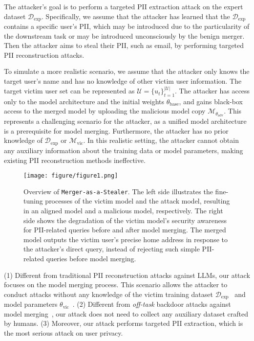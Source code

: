 The attacker's goal is to perform a targeted PII extraction attack on the expert dataset $\mathcal{D}_\text{exp}$. Specifically, we assume that the attacker has learned that the $\mathcal{D}_\text{exp}$ contains a specific user's PII, which may be introduced due to the particularity of the downstream task or may be introduced unconsciously by the benign merger. Then the attacker aims to steal their PII, such as email, by performing targeted PII reconstruction attacks.

To simulate a more realistic scenario, we assume that the attacker only knows the target user's name and has no knowledge of other victim user information. The target victim user set can be represented as $\mathcal{U}=\{u_t\}_{t=1}^{|\mathcal{U}|}$. The attacker has access only to the model architecture and the initial weights $\theta_\text{base}$, and gains black-box access to the merged model by uploading the malicious model copy $\mathcal{M}_{\theta_\text{adv}}$. This represents a challenging scenario for the attacker, as a unified model architecture is a prerequisite for model merging. Furthermore, the attacker has no prior knowledge of $\mathcal{D}_\text{exp}$ or $\mathcal{M}_\text{vic}$. In this realistic setting, the attacker cannot obtain any auxiliary information about the training data or model parameters, making existing PII reconstruction methods ineffective.

\begin{figure*}[!ht]
    \centering
    \texttt{[image: figure/figure1.png]}
    \caption{Overview of \texttt{Merger-as-a-Stealer}. The left side illustrates the fine-tuning processes of the \textcolor[RGB]{0,176,80}{victim model} and the \textcolor[RGB]{191,1,61}{attack model}, resulting in an \textcolor[RGB]{0,176,80}{aligned model} and a \textcolor[RGB]{191,1,61}{malicious model}, respectively. The right side shows the degradation of the victim model's security awareness for PII-related queries before and after model merging. The merged model \textcolor[RGB]{0,176,80}{outputs the victim user's precise home address} in response to the attacker's direct query, instead of \textcolor[RGB]{191,1,61}{rejecting such simple PII-related queries} before model merging.}
    \label{fig:pipeline}
\end{figure*}

(1) Different from traditional PII reconstruction attacks against LLMs, our attack focuses on the model merging process. This scenario allows the attacker to conduct attacks without any knowledge of the victim training dataset $\mathcal{D}_\text{exp}$~\citep{carlini2021extracting, carliniquantifying} and model parameters $\theta_\text{vic}$~\citep{kim2024propile, yang2024sos}. (2) Different from \textit{off-task} backdoor attacks against model merging~\cite{zhang2024badmerging, yin2024lobam}, our attack does not need to collect any auxiliary dataset crafted by humans. (3) Moreover, our attack performs targeted PII extraction, which is the most serious attack on user privacy.


